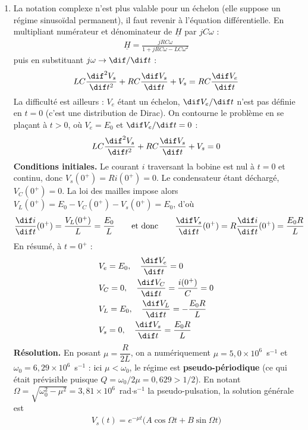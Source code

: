 \begin{correction}
\begin{enumerate}
	\item La notation complexe n'est plus valable pour un échelon (elle suppose un régime sinusoïdal permanent), il faut revenir à l'équation différentielle. En multipliant numérateur et dénominateur de $\underline{H}$ par $jC\omega$ :
	\begin{align*}
		\underline{H}=\frac{jRC\omega}{1+jRC\omega-LC\omega^2}
	\end{align*}
	puis en substituant $j\omega\rightarrow\dif/\dif t$ :
	\begin{align*}
		LC\frac{\dif^2V_s}{\dif t^2}+RC\frac{\dif V_s}{\dif t}+V_s=RC\frac{\dif V_e}{\dif t}
	\end{align*}
	La difficulté est ailleurs : $V_e$ étant un échelon, $\dif V_e/\dif t$ n'est pas définie en $t=0$ (c'est une distribution de Dirac). On contourne le problème en se plaçant à $t>0$, où $V_e=E_0$ et $\dif V_e/\dif t=0$ :
	\begin{align*}
		LC\frac{\dif^2V_s}{\dif t^2}+RC\frac{\dif V_s}{\dif t}+V_s=0
	\end{align*}
	\textbf{Conditions initiales.} Le courant $i$ traversant la bobine est nul à $t=0$ et continu, donc $V_s(0^+)=Ri(0^+)=0$. Le condensateur étant déchargé, $V_C(0^+)=0$. La loi des mailles impose alors $V_L(0^+)=E_0-V_C(0^+)-V_s(0^+)=E_0$, d'où
	\begin{align*}
		\frac{\dif i}{\dif t}(0^+)=\frac{V_L(0^+)}{L}=\frac{E_0}{L}
		\qquad\text{et donc}\qquad
		\frac{\dif V_s}{\dif t}(0^+)=R\frac{\dif i}{\dif t}(0^+)=\frac{E_0R}{L}
	\end{align*}
	En résumé, à $t=0^+$ :
	\begin{align*}
		&V_e=E_0, \quad \frac{\dif V_e}{\dif t}=0 \\
		&V_C=0, \quad \frac{\dif V_C}{\dif t}=\frac{i(0^+)}{C}=0 \\
		&V_L=E_0, \quad \frac{\dif V_L}{\dif t}=-\frac{E_0R}{L} \\
		&V_s=0, \quad \frac{\dif V_s}{\dif t}=\frac{E_0R}{L}
	\end{align*}
	\textbf{Résolution.} En posant $\mu=\dfrac{R}{2L}$, on a numériquement $\mu=5,0\times10^{6}$~s$^{-1}$ et $\omega_0=6,29\times10^{6}$~s$^{-1}$ : ici $\mu<\omega_0$, le régime est \textbf{pseudo-périodique} (ce qui était prévisible puisque $Q=\omega_0/2\mu=0,629>1/2$). En notant $\Omega=\sqrt{\omega_0^2-\mu^2}=3,81\times10^{6}$~rad$\cdot$s$^{-1}$ la pseudo-pulsation, la solution générale est
	\begin{align*}
		V_s(t)=e^{-\mu t}\big(A\cos\Omega t+B\sin\Omega t\big)
	\end{align*}

\end{enumerate}
\end{correction}
